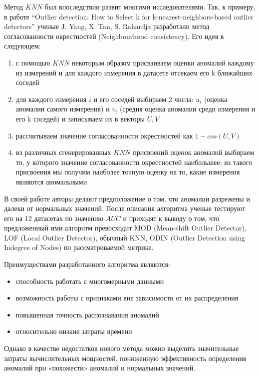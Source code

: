 \documentclass[14pt, letterpaper]{extarticle}
\begin{document}
Метод $KNN$ был впоследствии развит многими исследователями. Так, к примеру, в работе “Outlier detection: How to Select k for k-nearest-neighbors-based outlier detectors” ученые J. Yang, X. Tan, S. Rahardja \cite{yang2023outlier} разработали метод согласованности окрестностей (Neighbourhood consistency). Его идея в следующем:

\begin{enumerate}
    \item  с помощью $KNN$ некоторым образом присваиваем оценки аномалий каждому из измерений и для каждого измерения в датасете отсекаем его k ближайших соседей
    \item для каждого измерения $i$ и его соседей выбираем 2 числа: $u_i$ (оценка аномалии самого измерения) и $v_i$ (средня оценка аномалии среди измерения и его k соседей) и записываем их в векторы $U, V$
    \item рассчитываем значение согласованности окрестностей как $1-cos(U, V)$
    \item из различных сгенерированных $KNN$ присвоений оценок аномалий выбираем то, у которого значение согласованности окрестностей наибольшее; из такого присвоения мы получим наиболее точную оценку на то, какие измерения являются аномальными
\end{enumerate}

В своей работе авторы делают предположение о том, что аномалии разрежены и далеки от нормальных значений. После описания алгоритма ученые тестируют его на 12 датасетах по значению $AUC$ и приходят к выводу о том, что предложенный ими алгоритм превосходит MOD (Mean-shift Outlier Detector), LOF (Local Outlier Detector), обычный KNN, ODIN (Outlier Detection using Indegree of Nodes) по рассматриваемой метрике. 

Преимуществами разработанного алгоритма являются:
\begin{itemize}
    \item способность работать с многомерными данными
    \item возможность работы с признаками вне зависимости от их распределения
    \item повышенная точность распознавания аномалий
    \item относительно низкие затраты времени
\end{itemize}

Однако в качестве недостатков нового метода можно выделить значительные затраты вычислительных мощностей, пониженную эффективность определения аномалий при «похожести» аномалий и нормальных значений.
\end{document}
